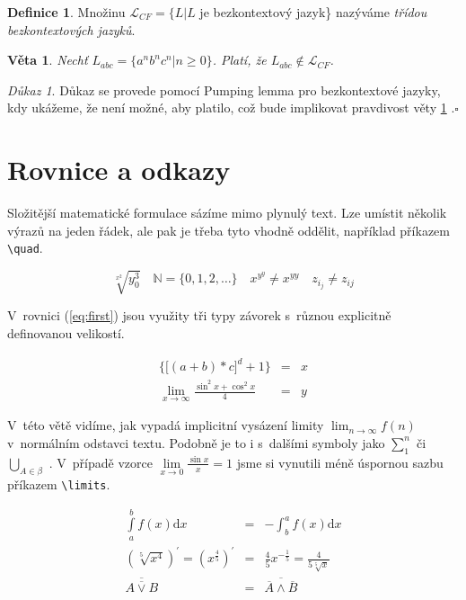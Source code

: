 \documentclass[a4paper,twocolumn,11pt]{article}
\newcommand*{\QEDB}{\hfill\ensuremath{\square}}
\theoremstyle{definition}
\newtheorem{definice}{Definice}[section]
\newtheorem{veta}{Věta}
\theoremstyle{remark}
\newtheorem*{dokaz}{Důkaz}
\begin{document}
	\begin{definice}
	Množinu $\mathcal{L}_{CF} = \{L|L$ je bezkontextový jazyk\} nazýváme \textit{třídou bezkontextových jazyků}.
	\end{definice}
	
	\begin{veta}\label{veta:first}	
	\textit{Nechť $L_{abc} = \{a^nb^nc^n|n \geq 0\}$. Platí, že $L_{abc} \notin \mathcal{L}_{CF}$.}
	\end{veta}
	
	\begin{dokaz}	
	Důkaz se provede pomocí Pumping lemma pro bezkontextové jazyky, kdy ukážeme, že není možné, aby platilo, což bude implikovat pravdivost věty \ref{veta:first} .\QEDB
	\end{dokaz}
	
	\section{Rovnice a odkazy}
	
	Složitější matematické formulace sázíme mimo plynulý text. Lze umístit několik výrazů na jeden řádek, ale pak je třeba tyto vhodně oddělit, například příkazem \verb+\quad+. 
	
	\begin{equation*} 
		\sqrt[x^2]{y_0^3}\quad\mathbb{N} = \{0,1,2,\ldots\}\quad x^{y^y} \neq x^{yy}\quad z_{i_j} \neq z_{ij}
	\end{equation*}
	
	V~rovnici (\ref{eq:first}) jsou využity tři typy závorek s~různou explicitně definovanou velikostí.

	\begin{eqnarray}\label{eq:first}
		\bigg\{\Big[\left(a + b \right) * c \Big] ^d + 1 \bigg\} & = & x  \\ \lim\limits_{x\to\infty} \frac{\sin^2x + \cos^2x}{4} & = & y \nonumber
	\end{eqnarray}
	
	V~této větě vidíme, jak vypadá implicitní vysázení limity $\lim_{n \to \infty} f\left(n\right)$ v~normálním odstavci textu. Podobně je to i s~dalšími symboly jako $\sum_1^n$ či $\bigcup_{A\in \beta}$ . V~případě vzorce $\lim\limits_{x\to 0}\frac{\sin x}{x} = 1$ jsme si vynutili méně úspornou sazbu příkazem \verb+\limits+.
	
	\begin{eqnarray}
		\int\limits_{a}^{b} f\left(x\right)\mathrm{d}x & = & -\int_b^a f\left(x\right)\mathrm{d}x \\
		\left(\sqrt[5]{x^4}\right)^\prime = \left(x^{\frac{4}{5}}\right)^\prime & = & \frac{4}{5}x^{-\frac{1}{5}} = \frac{4}{5\sqrt[5]{x}} \\
		\overline{\overline{A\vee B}} & = & \overline{\overline{A} \wedge \overline{B}}
	\end{eqnarray}
	
\end{document}
